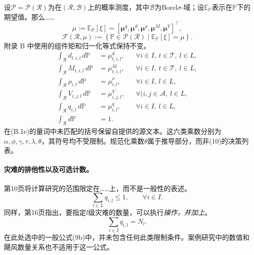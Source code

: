\documentclass{article}
\begin{document}
设$\mathcal P=\mathcal P(\mathcal R)$为在$(\mathcal R,\mathcal B)$上的概率测度，其中$\mathcal B$为Borel$\sigma$-域；设$\mathbb E_{\mathbb P}$表示在$\mathbb P$下的期望值。那么……
\[
\mu:=\mathbb E_{\mathbb P}[\xi]
=[\boldsymbol\mu^q,\boldsymbol\mu^d,\boldsymbol\mu^\rho,
\boldsymbol\mu^M,\boldsymbol\mu^V]^\top,
\]
\begin{equation}
\mathcal F(\mathcal R,\mu):=
\left\{\mathbb P\in\mathcal P(\mathcal R)\mid
\mathbb E_{\mathbb P}[\xi]=\mu\right\}.\tag{4}
\end{equation}
附录 B 中使用的组件矩和归一化等式保持不变。
\begin{align}
\int_{\mathcal R}d_{t,i,l}\,d\mathbb P&=\mu^d_{t,i,l},
&&\forall i\in I,\ t\in\mathcal T,\ l\in L,\tag{B.1b}\\
\int_{\mathcal R}M_{t,i,l}\,d\mathbb P&=\mu^M_{t,i,l},
&&\forall i\in I,\ t\in\mathcal T,\ l\in L,\tag{B.1c}\\
\int_{\mathcal R}\rho_{i,l}\,d\mathbb P&=\mu^\rho_{i,l},
&&\forall i\in I,\ l\in L,\tag{B.1d}\\
\int_{\mathcal R}V_{i,j,l}\,d\mathbb P&=\mu^V_{i,j,l},
&&\forall(i,j\in\mathcal A,\ l\in L,\tag{B.1e}\\
\int_{\mathcal R}q_{i,l}\,d\mathbb P&=\mu^q_{i,l},
&&\forall i\in I,\ l\in L,\tag{B.1f}\\
\int_{\mathcal R}d\mathbb P&=1.\tag{B.1g}
\end{align}
在(B.1e)的量词中未匹配的括号保留自提供的源文本。这六类乘数分别为$\alpha,\phi,\gamma,\tau,\lambda,\theta$，其符号均不受限制。规范化乘数$\theta$属于推导部分，而非(10)的决策列表。

\paragraph{灾难的排他性以及可选计数。}
第10页将计算研究的范围限定在……上，而不是一般性的表述。
\[
\sum_{l\in L}q_{i,l}\leq1,\qquad\forall i\in I.
\]
同样，第16页指出，要指定$l$级灾难的数量，可以执行\emph{操作，并加上}。
\[
\sum_{i\in I}q_{i,l}=N_l.
\]
在此处选中的一般公式(9b)中，并未包含任何此类限制条件。案例研究中的数值和飓风数量关系也不适用于这一公式。
\end{document}
